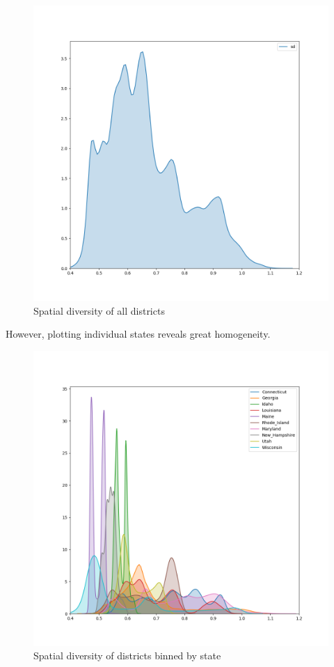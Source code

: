 \documentclass[]{article}
\begin{document}
\begin{figure}
\centering
\includegraphics{../30_results/all_districts_concat_sd.png}
\caption{Spatial diversity of all districts}
\end{figure}

However, plotting individual states reveals great homogeneity.

\begin{figure}
\centering
\includegraphics{../30_results/all_districts_sd.png}
\caption{Spatial diversity of districts binned by state}
\end{figure}
\end{document}
